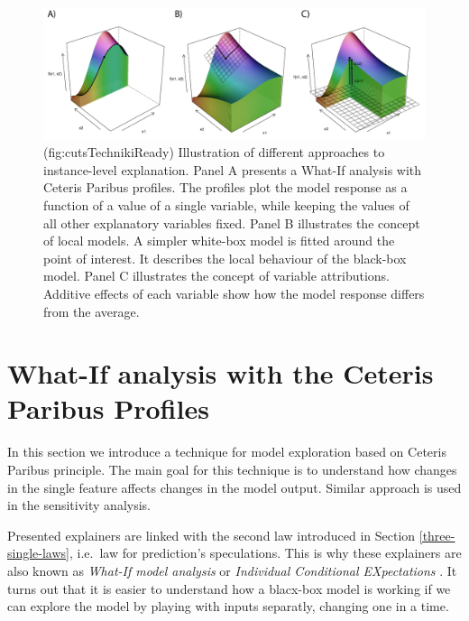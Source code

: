 \documentclass[]{krantz}
\theoremstyle{definition}
\theoremstyle{definition}
\theoremstyle{definition}
\theoremstyle{remark}
\begin{document}
\begin{figure}

{\centering \includegraphics[width=0.99\linewidth]{figure/cuts_techniki_ready} 

}

\caption{(fig:cutsTechnikiReady) Illustration of different approaches to instance-level explanation. Panel A presents a What-If analysis with Ceteris Paribus profiles. The profiles plot the model response as a function of a value of a single variable, while keeping the values of all other explanatory variables fixed. Panel B illustrates the concept of local models. A simpler white-box model is fitted around the point of interest. It describes the local behaviour of the black-box model. Panel C illustrates the concept of variable attributions. Additive effects of each variable show how the model response differs from the average.}\label{fig:cutsTechnikiReady}
\end{figure}

\hypertarget{ceterisParibus}{%
\section{What-If analysis with the Ceteris Paribus
Profiles}\label{ceterisParibus}}

In this section we introduce a technique for model exploration based on
Ceteris Paribus principle. The main goal for this technique is to
understand how changes in the single feature affects changes in the
model output. Similar approach is used in the sensitivity analysis.

Presented explainers are linked with the second law introduced in
Section \ref{three-single-laws}, i.e.~law for prediction's speculations.
This is why these explainers are also known as \emph{What-If model
analysis} or \emph{Individual Conditional EXpectations} \citep{ICEbox}.
It turns out that it is easier to understand how a blacx-box model is
working if we can explore the model by playing with inputs separatly,
changing one in a time.
\end{document}
